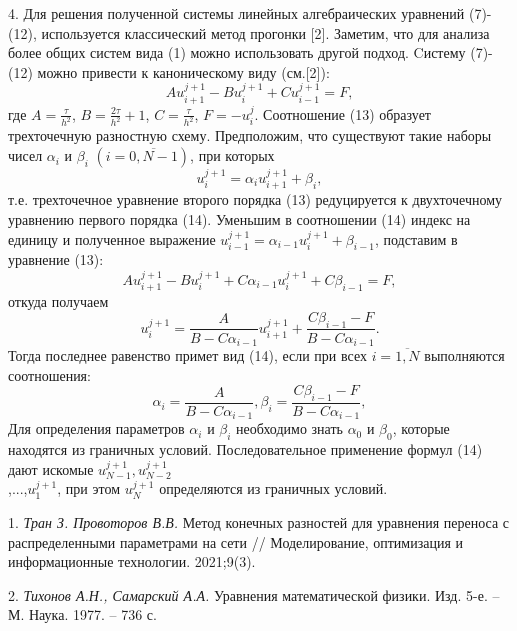 4. Для решения полученной системы линейных алгебраических уравнений (7)-(12), используется классический метод прогонки [2]. 
Заметим, что для анализа более общих систем вида (1) можно использовать другой подход. Cистему (7)-(12) можно привести к каноническому виду (см.[2]):
\begin{equation}\label{tran_eq13}
Au_{i+1}^{j+1}-Bu_{i}^{j+1}+Cu_{i-1}^{j+1}=F,
\end{equation}
где $A=\frac{\tau }{{{h}^{2}}}$, $B=\frac{2\tau }{{{h}^{2}}}+1$, $C=\frac{\tau }{{{h}^{2}}}$, $F=-u_{i}^{j}$. Соотношение (13) образует трехточечную разностную схему. Предположим, что существуют такие наборы чисел ${{\alpha }_{i}}$ и ${{\beta }_{i}}$ $\left( i=\overline{0,N-1} \right)$, при которых
\begin{equation}\label{tran_eq14}
u_{i}^{j+1}={{\alpha }_{i}}u_{i+1}^{j+1}+{{\beta }_{i}},
\end{equation}
т.е. трехточечное уравнение второго порядка (13) редуцируется к двухточечному уравнению первого порядка (14). 
Уменьшим в соотношении (14) индекс на единицу и полученное выражение $u_{i-1}^{j+1}={{\alpha }_{i-1}}u_{i}^{j+1}+{{\beta }_{i-1}}$, подставим в уравнение (13):
\[Au_{i+1}^{j+1}-Bu_{i}^{j+1}+C{{\alpha }_{i-1}}u_{i}^{j+1}+C{{\beta }_{i-1}}=F,\]
откуда получаем
\[u_{i}^{j+1}=\frac{A}{B-C{{\alpha }_{i-1}}}u_{i+1}^{j+1}+\frac{C{{\beta }_{i-1}}-F}{B-C{{\alpha }_{i-1}}}.\]
Тогда последнее равенство примет вид (14), если при всех $i=\overline{1,N}$ выполняются соотношения:
\[{{\alpha }_{i}}=\frac{A}{B-C{{\alpha }_{i-1}}},{{\beta }_{i}}=\frac{C{{\beta }_{i-1}}-F}{B-C{{\alpha }_{i-1}}},\]
Для определения параметров ${{\alpha }_{i}}$ и ${{\beta }_{i}}$ необходимо знать ${{\alpha }_{0}}$ и ${{\beta }_{0}}$, которые находятся из граничных условий. Последовательное применение формул (14) дают искомые $u_{N-1}^{j+1},u_{N-2}^{j+1}$\\,...,$u_{1}^{j+1}$, при этом $u_{N}^{j+1}$ определяются из граничных условий.

\litlist

1. {\it Тран З. Провоторов В.В. }
Метод конечных разностей для уравнения переноса с распределенными параметрами на сети // Моделирование, оптимизация и информационные технологии. 2021;9(3). 

2. {\it Тихонов А.Н., Самарский А.А. }
 Уравнения математической физики. Изд. 5-е. – М. Наука. 1977. – 736 с.
